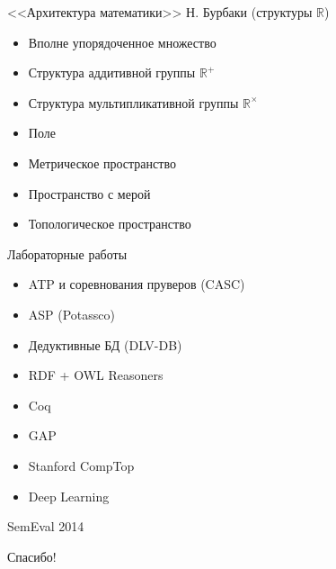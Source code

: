 \documentclass{beamer}
\begin{document}
\begin{frame}{<<Архитектура математики>> Н. Бурбаки (структуры $\mathbb{R}$)}
    \begin{itemize}
        \item Вполне упорядоченное множество
        \item Структура аддитивной группы $\mathbb{R}^+$
        \item Структура мультипликативной группы $\mathbb{R}^\times$
        \item Поле 
        \item Метрическое пространство
        \item Пространство с мерой
        \item Топологическое пространство
    \end{itemize}
\end{frame}


\begin{frame}{Лабораторные работы}
    \begin{itemize}
        \item ATP и соревнования пруверов (CASC)
        \item ASP (Potassco)
        \item Дедуктивные БД (DLV-DB)
        \item RDF + OWL Reasoners
        \item Coq
        \item GAP
        \item Stanford CompTop
        \item Deep Learning
    \end{itemize}
\end{frame}

\begin{frame}{SemEval 2014}
\end{frame}


\begin{frame}{}
    \thispagestyle{empty}
    \begin{center}
        {\large Спасибо!}
    \end{center}
\end{frame}


\end{document}
